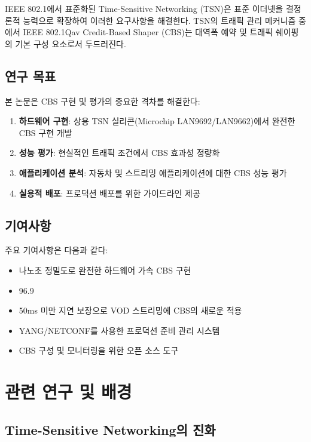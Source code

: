 \documentclass[twocolumn,10pt]{article}
\begin{document}
IEEE 802.1에서 표준화된 Time-Sensitive Networking (TSN)은 표준 이더넷을 결정론적 능력으로 확장하여 이러한 요구사항을 해결한다. TSN의 트래픽 관리 메커니즘 중에서 IEEE 802.1Qav Credit-Based Shaper (CBS)는 대역폭 예약 및 트래픽 쉐이핑의 기본 구성 요소로서 두드러진다.

\subsection{연구 목표}

본 논문은 CBS 구현 및 평가의 중요한 격차를 해결한다:

\begin{enumerate}
    \item \textbf{하드웨어 구현}: 상용 TSN 실리콘(Microchip LAN9692/LAN9662)에서 완전한 CBS 구현 개발
    \item \textbf{성능 평가}: 현실적인 트래픽 조건에서 CBS 효과성 정량화
    \item \textbf{애플리케이션 분석}: 자동차 및 스트리밍 애플리케이션에 대한 CBS 성능 평가
    \item \textbf{실용적 배포}: 프로덕션 배포를 위한 가이드라인 제공
\end{enumerate}

\subsection{기여사항}

주요 기여사항은 다음과 같다:

\begin{itemize}
    \item 나노초 정밀도로 완전한 하드웨어 가속 CBS 구현
    \item 96.9%
    \item 50ms 미만 지연 보장으로 VOD 스트리밍에 CBS의 새로운 적용
    \item YANG/NETCONF를 사용한 프로덕션 준비 관리 시스템
    \item CBS 구성 및 모니터링을 위한 오픈 소스 도구
\end{itemize}

\section{관련 연구 및 배경}

\subsection{Time-Sensitive Networking의 진화}
\end{document}
